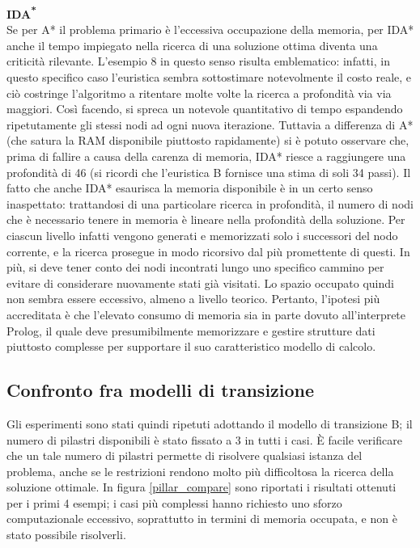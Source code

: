 \noindent\textbf{\textbf{IDA\textsuperscript{*}}}\\
Se per A* il problema primario è l'eccessiva occupazione della memoria, per IDA* anche il tempo impiegato nella ricerca di una soluzione ottima diventa una criticità rilevante. L'esempio 8 in questo senso risulta emblematico: infatti, in questo specifico caso l'euristica sembra sottostimare notevolmente il costo reale, e ciò costringe l'algoritmo a ritentare molte volte la ricerca a profondità via via maggiori. Così facendo, si spreca un notevole quantitativo di tempo espandendo ripetutamente gli stessi nodi ad ogni nuova iterazione. Tuttavia a differenza di A* (che satura la RAM disponibile piuttosto rapidamente) si è potuto osservare che, prima di fallire a causa della carenza di memoria, IDA* riesce a raggiungere una profondità di 46 (si ricordi che l'euristica B fornisce una stima di soli 34 passi). Il fatto che anche IDA* esaurisca la memoria disponibile è in un certo senso inaspettato: trattandosi di una particolare ricerca in profondità, il numero di nodi che è necessario tenere in memoria è lineare nella profondità della soluzione. Per ciascun livello infatti vengono generati e memorizzati solo i successori del nodo corrente, e la ricerca prosegue in modo ricorsivo dal più promettente di questi. In più, si deve tener conto dei nodi incontrati lungo uno specifico cammino per evitare di considerare nuovamente stati già visitati. Lo spazio occupato quindi non sembra essere eccessivo, almeno a livello teorico. Pertanto, l'ipotesi più accreditata è che l'elevato consumo di memoria sia in parte dovuto all'interprete Prolog, il quale deve presumibilmente memorizzare e gestire strutture dati piuttosto complesse per supportare il suo caratteristico modello di calcolo.

\subsection{Confronto fra modelli di transizione}

Gli esperimenti sono stati quindi ripetuti adottando il modello di transizione B; il numero di pilastri disponibili è stato fissato a 3 in tutti i casi. È facile verificare che un tale numero di pilastri permette di risolvere qualsiasi istanza del problema, anche se le restrizioni rendono molto più difficoltosa la ricerca della soluzione ottimale. In figura \ref{pillar_compare} sono riportati i risultati ottenuti per i primi 4 esempi; i casi più complessi hanno richiesto uno sforzo computazionale eccessivo, soprattutto in termini di memoria occupata, e non è stato possibile risolverli.

